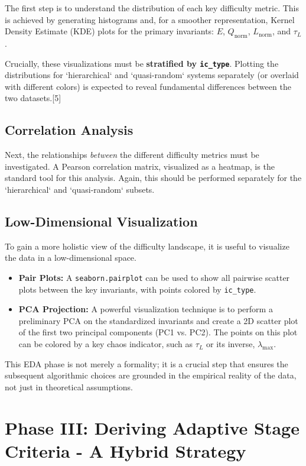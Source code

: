 The first step is to understand the distribution of each key difficulty metric. This is achieved by generating histograms and, for a smoother representation, Kernel Density Estimate (KDE) plots for the primary invariants: $E$, $Q_{\text{norm}}$, $L_{\text{norm}}$, and $\tau_L$.

Crucially, these visualizations must be \textbf{stratified by \texttt{ic\_type}}. Plotting the distributions for `hierarchical` and `quasi-random` systems separately (or overlaid with different colors) is expected to reveal fundamental differences between the two datasets.[5]

\subsection{Correlation Analysis}

Next, the relationships \textit{between} the different difficulty metrics must be investigated. A Pearson correlation matrix, visualized as a heatmap, is the standard tool for this analysis. Again, this should be performed separately for the `hierarchical` and `quasi-random` subsets.

\subsection{Low-Dimensional Visualization}

To gain a more holistic view of the difficulty landscape, it is useful to visualize the data in a low-dimensional space.
\begin{itemize}
    \item \textbf{Pair Plots:} A \texttt{seaborn.pairplot} can be used to show all pairwise scatter plots between the key invariants, with points colored by \texttt{ic\_type}.
    \item \textbf{PCA Projection:} A powerful visualization technique is to perform a preliminary PCA on the standardized invariants and create a 2D scatter plot of the first two principal components (PC1 vs. PC2). The points on this plot can be colored by a key chaos indicator, such as $\tau_L$ or its inverse, $\lambda_{\text{max}}$.
\end{itemize}
This EDA phase is not merely a formality; it is a crucial step that ensures the subsequent algorithmic choices are grounded in the empirical reality of the data, not just in theoretical assumptions.

\section{Phase III: Deriving Adaptive Stage Criteria - A Hybrid Strategy}

